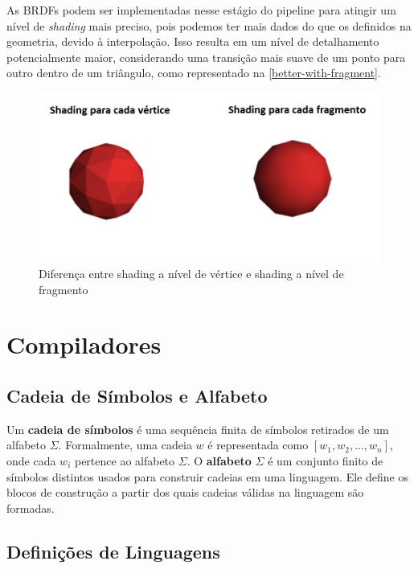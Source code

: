 \documentclass[english, 
               brazil, 
               bsc] %
               {dcomp-abntex2}
\begin{document}
As BRDFs podem ser implementadas nesse estágio do pipeline para atingir um nível de \textit{shading} mais preciso, pois podemos ter mais dados do que os definidos na geometria, devido à interpolação. Isso resulta em um nível de detalhamento potencialmente maior, considerando uma transição mais suave de um ponto para outro dentro de um triângulo,  como representado na \autoref{better-with-fragment}.


\begin{figure}[H]
	\caption{\label{better-with-fragment} \small Diferença entre shading a nível de vértice e shading a nível de fragmento}
	\begin{center}
	    \includegraphics[scale=0.5]{./Imagens/per_vertex_per_frag.png}
	\end{center}
\end{figure}

\section{Compiladores} \label{compiladores}

\subsection{Cadeia de Símbolos e Alfabeto} \label{símbolos}

Um \textbf{cadeia de símbolos} é uma sequência finita de símbolos retirados de um alfabeto $ \Sigma $. Formalmente, uma cadeia $ w $ é representada como $ [w_1, w_2, ..., w_n] $, onde cada $ w_i $ pertence ao alfabeto $ \Sigma $. O \textbf{alfabeto} $ \Sigma $ é um conjunto finito de símbolos distintos usados para construir cadeias em uma linguagem. Ele define os blocos de construção a partir dos quais cadeias válidas na linguagem são formadas.

\subsection{Definições de Linguagens} \label{linguagem}
\end{document}

